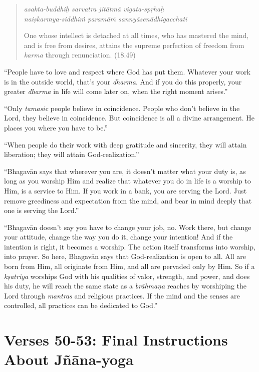 \documentclass[12pt, twoside, openright]{memoir}
\begin{document}
\par
\begin{verse}
\textit{asakta-buddhiḥ sarvatra jitātmā vigata-spṛhaḥ} \\
\textit{naiṣkarmya-siddhiṁ paramāṁ sannyāsenādhigacchati}

\noindent One whose intellect is detached at all times, who has mastered the mind, and is free from desires, attains the supreme perfection of freedom from \textit{karma} through renunciation. (18.49)
\end{verse}
\par



\enquote{People have to love and respect where God has put them. Whatever your work is in the outside world, that’s your \textit{dharma}. And if you do this properly, your greater \textit{dharma} in life will come later on, when the right moment arises.}

\enquote{Only \textit{tamasic} people believe in coincidence. People who don’t believe in the Lord, they believe in coincidence. But coincidence is all a divine arrangement. He places you where you have to be.}

\enquote{When people do their work with deep gratitude and sincerity, they will attain liberation; they will attain God-realization.}

\enquote{Bhagavān says that wherever you are, it doesn’t matter what your duty is, as long as you worship Him and realize that whatever you do in life is a worship to Him, is a service to Him. If you work in a bank, you are serving the Lord. Just remove greediness and expectation from the mind, and bear in mind deeply that one is serving the Lord.}

\enquote{Bhagavān doesn’t say you have to change your job, no. Work there, but change your attitude, change the way you do it, change your intention! And if the intention is right, it becomes a worship. The action itself transforms into worship, into prayer. So here, Bhagavān says that God-realization is open to all. All are born from Him, all originate from Him, and all are pervaded only by Him. So if a \textit{kṣatriya} worships God with his qualities of valor, strength, and power, and does his duty, he will reach the same state as a \textit{brāhmaṇa} reaches by worshiping the Lord through \textit{mantras} and religious practices. If the mind and the senses are controlled, all practices can be dedicated to God.}

\newpage
\section{Verses 50-53: Final Instructions About Jñāna-yoga}\label{sec-verses-50-53-final-instructions-about-jnana-yoga}
\end{document}
